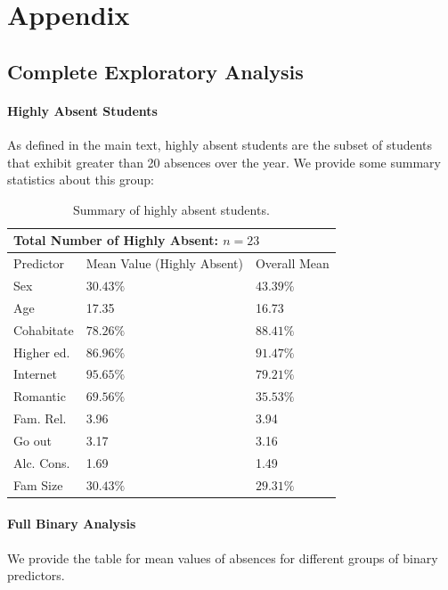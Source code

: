 \documentclass[12pt, titlepage]{article}
\begin{document}
	
	
	
	\newpage 
	
	\section*{Appendix}
	
	\subsection*{Complete Exploratory Analysis}
	\paragraph{Highly Absent Students} As defined in the main text, highly absent students are the subset of students that exhibit greater than 20 absences over the year. We provide some summary statistics about this group:
	
	\begin{table}[h!]
		\centering
		\begin{tabular}{|l|l|l|}
			\multicolumn{3}{l}{Total Number of Highly Absent: $n = 23$} \\
			\hline
			Predictor & Mean Value (Highly Absent) & Overall Mean \\
			\hline
			Sex & $30.43\%$ & $43.39 \%$ \\
			Age & 17.35 & 16.73 \\
			Cohabitate & $78.26\%$ & $88.41\%$ \\
			Higher ed. & $86.96\%$ & $91.47\%$ \\
			Internet & $95.65\%$ & $79.21\%$ \\
			Romantic & $69.56\%$ & $35.53\%$ \\
			Fam. Rel. & 3.96 & 3.94 \\
			Go out & 3.17 & 3.16 \\
			Alc. Cons. & 1.69 & 1.49 \\
			Fam Size & $30.43\%$ & $29.31\%$\\
			\hline
		\end{tabular}
	\caption{Summary of highly absent students.}
	\end{table}

	\paragraph{Full Binary Analysis} We provide the table for mean values of absences for different groups of binary predictors.
	
\end{document}
